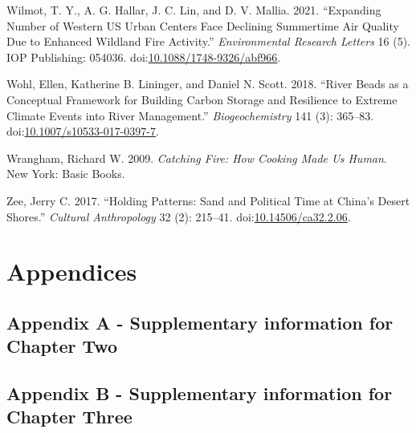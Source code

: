 \documentclass[
]{article}
\newlength{\cslhangindent}
\newenvironment{CSLReferences}[2] %
 {\begin{list}{}{%
  \setlength{\itemindent}{0pt}
  \setlength{\leftmargin}{0pt}
  \setlength{\parsep}{0pt}
  \ifodd #1
   \setlength{\leftmargin}{\cslhangindent}
   \setlength{\itemindent}{-1\cslhangindent}
  \fi
  \setlength{\itemsep}{#2\baselineskip}}}
 {\end{list}}
\begin{document}
\begin{CSLReferences}{1}{0}
Wilmot, T. Y., A. G. Hallar, J. C. Lin, and D. V. Mallia. 2021. {``Expanding Number of {Western US} Urban Centers Face Declining Summertime Air Quality Due to Enhanced Wildland Fire Activity.''} \emph{Environmental Research Letters} 16 (5). IOP Publishing: 054036. doi:\href{https://doi.org/10.1088/1748-9326/abf966}{10.1088/1748-9326/abf966}.

Wohl, Ellen, Katherine B. Lininger, and Daniel N. Scott. 2018. {``River Beads as a Conceptual Framework for Building Carbon Storage and Resilience to Extreme Climate Events into River Management.''} \emph{Biogeochemistry} 141 (3): 365--83. doi:\href{https://doi.org/10.1007/s10533-017-0397-7}{10.1007/s10533-017-0397-7}.

Wrangham, Richard W. 2009. \emph{Catching Fire: How Cooking Made Us Human}. New York: Basic Books.

Zee, Jerry C. 2017. {``Holding {Patterns}: {Sand} and {Political Time} at {China}'s {Desert Shores}.''} \emph{Cultural Anthropology} 32 (2): 215--41. doi:\href{https://doi.org/10.14506/ca32.2.06}{10.14506/ca32.2.06}.

\end{CSLReferences}

\clearpage

\setlength{\parindent}{4em} 
\linespread{1}
\doublespacing

\section*{Appendices}

\setcounter{secnumdepth}{0}

\subsection{Appendix A - Supplementary information for Chapter Two}\label{appendix-a---supplementary-information-for-chapter-two}

\renewcommand{\thefigure}{A2.\arabic{figure}}
\setcounter{figure}{0}
\renewcommand{\thetable}{A2.\arabic{table}}
\setcounter{table}{0}
\renewcommand{\theequation}{A2.\arabic{equation}}
\setcounter{equation}{0}

\subsection{Appendix B - Supplementary information for Chapter Three}\label{appendix-b---supplementary-information-for-chapter-three}
\end{document}
